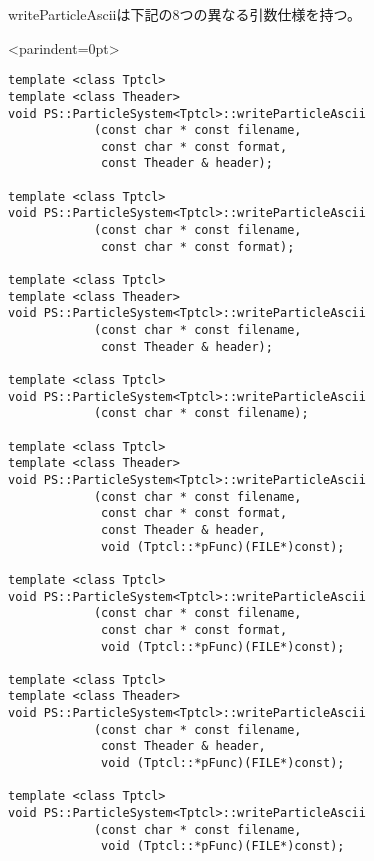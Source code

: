 writeParticleAsciiは下記の8つの異なる引数仕様を持つ。
\begin{breakitembox}<parindent=0pt>{}
\begin{verbatim}
template <class Tptcl>
template <class Theader>
void PS::ParticleSystem<Tptcl>::writeParticleAscii
            (const char * const filename,
             const char * const format,
             const Theader & header);
             
template <class Tptcl>
void PS::ParticleSystem<Tptcl>::writeParticleAscii
            (const char * const filename,
             const char * const format);

template <class Tptcl>
template <class Theader>
void PS::ParticleSystem<Tptcl>::writeParticleAscii
            (const char * const filename,
             const Theader & header);

template <class Tptcl>
void PS::ParticleSystem<Tptcl>::writeParticleAscii
            (const char * const filename);

template <class Tptcl>
template <class Theader>
void PS::ParticleSystem<Tptcl>::writeParticleAscii
            (const char * const filename,
             const char * const format,
             const Theader & header,
             void (Tptcl::*pFunc)(FILE*)const);

template <class Tptcl>
void PS::ParticleSystem<Tptcl>::writeParticleAscii
            (const char * const filename,
             const char * const format,
             void (Tptcl::*pFunc)(FILE*)const);

template <class Tptcl>             
template <class Theader>
void PS::ParticleSystem<Tptcl>::writeParticleAscii
            (const char * const filename,
             const Theader & header,
             void (Tptcl::*pFunc)(FILE*)const);
             
template <class Tptcl>                        
void PS::ParticleSystem<Tptcl>::writeParticleAscii
            (const char * const filename,
             void (Tptcl::*pFunc)(FILE*)const);
\end{verbatim}
\end{breakitembox}

